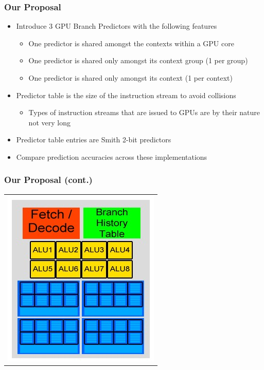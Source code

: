 \documentclass{beamer}
\begin{document}
\begin{frame}
	\frametitle{Our Proposal}
	\begin{itemize}
		\item<1-> Introduce 3 GPU Branch Predictors with the following features
		\begin{itemize}
			\item<2-> One predictor is shared amongst the contexts within a GPU core
			\item<2-> One predictor is shared only amongst its context group (1 per group)
			\item<2-> One predictor is shared only amongst its context (1 per context)
		\end{itemize}
		\item<3-> Predictor table is the size of the instruction stream to avoid collisions
		\begin{itemize}
			\item<3-> Types of instruction streams that are issued to GPUs are by their nature not very long
		\end{itemize}
		\item<4-> Predictor table entries are Smith 2-bit predictors
		\item<5-> Compare prediction accuracies across these implementations
	\end{itemize}
\end{frame}

\begin{frame}
	\frametitle{Our Proposal (cont.)}
	\begin{tabular}{c}
		\includegraphics[width=.5\textwidth]{Our-GPU---per-core-predictor.jpg}
	\end{tabular}
\end{frame}
\end{document}
